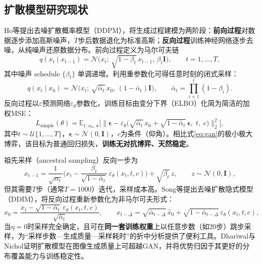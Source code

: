 \documentclass[12pt, a4paper]{ctexart}
\begin{document}
\subsection{扩散模型研究现状}
Ho等\cite{ho2020denoising}提出去噪扩散概率模型（DDPM），将生成过程建模为两阶段：\textbf{前向过程}对数据逐步添加高斯噪声，$T$步后数据退化为标准高斯；\textbf{反向过程}训练神经网络逐步去噪，从纯噪声还原数据分布。前向过程定义为马尔可夫链
\begin{equation}
q(x_t \mid x_{t-1}) = \mathcal{N}\big(x_t;\,\sqrt{1-\beta_t}\,x_{t-1},\,\beta_t \mathbf{I}\big),\qquad t=1,\dots,T,
\label{eq:forward}
\end{equation}
其中噪声 schedule $\{\beta_t\}$ 单调递增。利用重参数化可得任意时刻的闭式采样：
\begin{equation}
q(x_t \mid x_0) = \mathcal{N}\big(x_t;\,\sqrt{\bar{\alpha}_t}\,x_0,\,(1-\bar{\alpha}_t)\mathbf{I}\big),\qquad \bar{\alpha}_t=\prod_{i=1}^{t}(1-\beta_i).
\label{eq:forward-closed}
\end{equation}
反向过程以$\varepsilon$预测网络$\varepsilon_\theta$参数化，训练目标由变分下界（ELBO）化简为简洁的加权MSE：
\begin{equation}
L_{\text{simple}}(\theta) = \mathbb{E}_{t,\,x_0,\,\boldsymbol{\epsilon}}\Big[\big\|\boldsymbol{\epsilon} - \varepsilon_\theta\big(\sqrt{\bar{\alpha}_t}\,x_0 + \sqrt{1-\bar{\alpha}_t}\,\boldsymbol{\epsilon},\; t,\; c\big)\big\|_2^2\Big],
\label{eq:ddpm-loss}
\end{equation}
其中$t\sim\mathcal{U}\{1,\dots,T\}$，$\boldsymbol{\epsilon}\sim\mathcal{N}(0,\mathbf{I})$，$c$为条件（仰角）。相比式\eqref{eq:gan}的极小极大博弈，该目标为普通回归损失，\textbf{训练无对抗博弈、天然稳定}。

祖先采样（ancestral sampling）反向一步为
\begin{equation}
x_{t-1} = \frac{1}{\sqrt{\alpha_t}}\Big(x_t - \frac{\beta_t}{\sqrt{1-\bar{\alpha}_t}}\,\varepsilon_\theta(x_t, t, c)\Big) + \sqrt{\beta_t}\, z,\qquad z\sim\mathcal{N}(0,\mathbf{I}),
\label{eq:reverse}
\end{equation}
但其需要$T$步（通常$T=1000$）迭代，采样成本高。Song等\cite{song2021denoising}提出去噪扩散隐式模型（DDIM），将反向过程重新参数化为非马尔可夫形式：
\begin{equation}
\hat{x}_0 = \frac{x_t - \sqrt{1-\bar{\alpha}_t}\,\varepsilon_\theta(x_t,t,c)}{\sqrt{\bar{\alpha}_t}},\qquad
x_{t-\Delta} = \sqrt{\bar{\alpha}_{t-\Delta}}\,\hat{x}_0 + \sqrt{1-\bar{\alpha}_{t-\Delta}}\,\varepsilon_\theta(x_t,t,c),
\label{eq:ddim}
\end{equation}
当$\eta=0$时采样完全确定，且可在\textbf{同一套训练权重}上以任意步数（如20步）跳步采样，为“采样步数—生成质量—采样耗时”的折中分析提供了便利工具。Dhariwal与Nichol\cite{dhariwal2021diffusion}证明扩散模型在图像生成质量上可超越GAN，并将优势归因于其更好的分布覆盖能力与训练稳定性。
\end{document}
